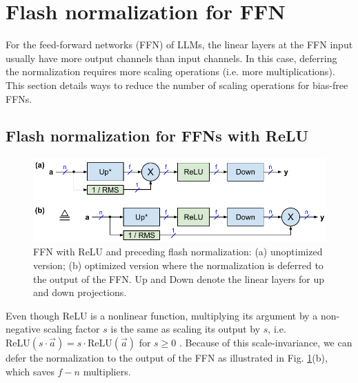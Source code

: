\documentclass{article}
\def\a{\vec{a}}                       %
\begin{document}
\section{Flash normalization for FFN}
For the feed-forward networks (FFN) of LLMs, the linear layers at the FFN input usually have more output channels than input channels. In this case, deferring the normalization requires more scaling operations (i.e. more multiplications). This section details ways to reduce the number of scaling operations for bias-free FFNs.

\subsection{Flash normalization for FFNs with ReLU}
\begin{figure}[h!] \centering
  \includegraphics[scale=1.0]{../doc/fig/flashNorm_fig2.pdf}
  \caption{FFN with ReLU and preceding flash normalization: (a) unoptimized version; (b) optimized version where the normalization is deferred to the output of the FFN. Up and Down denote the linear layers for up and down projections.}
\label{fig2} \end{figure}

Even though ReLU is a nonlinear function, multiplying its argument by a non-negative scaling factor $s$ is the same as scaling its output by $s$, i.e. $\text{ReLU}(s \cdot \a) = s \cdot \text{ReLU}(\a)$ for $s \ge 0$ \citep{ReLU}. Because of this scale-invariance, we can defer the normalization to the output of the FFN as illustrated in Fig. \ref{fig2}(b), which saves $f - n$ multipliers.
\end{document}
